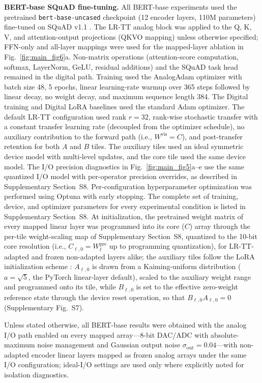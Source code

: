 \documentclass[fleqn,10pt]{wlscirep}
\begin{document}
\noindent\textbf{BERT-base SQuAD fine-tuning.}
All BERT-base experiments used the pretrained \texttt{bert-base-uncased} checkpoint (12 encoder layers, 110M parameters) fine-tuned on SQuAD v1.1 \cite{devlin2019bert,rajpurkar2016squad}. The LR-TT analog block was applied to the Q, K, V, and attention-output projections (QKVO mapping) unless otherwise specified; FFN-only and all-layer mappings were used for the mapped-layer ablation in Fig.~\ref{fig:main_fig6}a. Non-matrix operations (attention-score computation, softmax, LayerNorm, GeLU, residual additions) and the SQuAD task head remained in the digital path. Training used the AnalogAdam optimizer with batch size 48, 5 epochs, linear learning-rate warmup over 365 steps followed by linear decay, no weight decay, and maximum sequence length 384. The Digital training and Digital LoRA baselines used the standard Adam optimizer. The default LR-TT configuration used rank \(r=32\), rank-wise stochastic transfer with a constant transfer learning rate (decoupled from the optimizer schedule), no auxiliary contribution to the forward path (i.e., \(W^{\mathrm{vis}}=C\)), and post-transfer retention for both \(A\) and \(B\) tiles. The auxiliary tiles used an ideal symmetric device model with multi-level updates, and the core tile used the same device model. The I/O precision diagnostics in Fig.~\ref{fig:main_fig5}a--e use the same quantized I/O model with per-operator precision overrides, as described in Supplementary Section~S8. Per-configuration hyperparameter optimization was performed using Optuna with early stopping. The complete set of training, device, and optimizer parameters for every experimental condition is listed in Supplementary Section~S8. At initialization, the pretrained weight matrix of every mapped linear layer was programmed into its core (\(C\)) array through the per-tile weight-scaling map of Supplementary Section~S8, quantized to the 10-bit core resolution (i.e., \(C_{\ell,0}=W_{\ell}^{\mathrm{pre}}\) up to programming quantization), for LR-TT-adapted and frozen non-adapted layers alike; the auxiliary tiles follow the LoRA initialization scheme \cite{hu2021lora}: \(A_{\ell,0}\) is drawn from a Kaiming-uniform distribution (\(a=\sqrt{5}\), the PyTorch linear-layer default), scaled to the auxiliary weight range and programmed onto its tile, while \(B_{\ell,0}\) is set to the effective zero-weight reference state through the device reset operation, so that \(B_{\ell,0}A_{\ell,0}=0\) (Supplementary Fig.~S7).

Unless stated otherwise, all BERT-base results were obtained with the analog I/O path enabled on every mapped array---8-bit DAC/ADC with absolute-maximum noise management and Gaussian output noise \(\sigma_{\mathrm{out}}=0.04\)---with non-adapted encoder linear layers mapped as frozen analog arrays under the same I/O configuration; ideal-I/O settings are used only where explicitly noted for isolation diagnostics.
\end{document}
